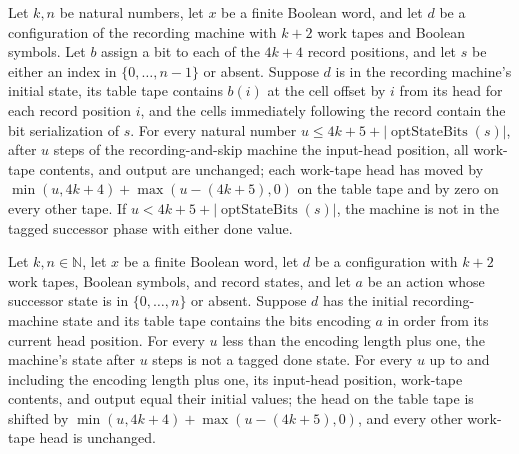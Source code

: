 \begin{lemma}
\label{Turing.StepBlock.recordSkipTM_path}
\leanok
{}
Let $k,n$ be natural numbers, let $x$ be a finite Boolean word, and let $d$ be a
configuration of the recording machine with $k+2$ work tapes and Boolean symbols. Let
$b$ assign a bit to each of the $4k+4$ record positions, and let $s$ be either an index
in $\{0,\ldots,n-1\}$ or absent. Suppose $d$ is in the recording machine's initial
state, its table tape contains $b(i)$ at the cell offset by $i$ from its head for each
record position $i$, and the cells immediately following the record contain the bit
serialization of $s$. For every natural number $u\le
4k+5+|\operatorname{optStateBits}(s)|$, after $u$ steps of the recording-and-skip
machine the input-head position, all work-tape contents, and output are unchanged; each
work-tape head has moved by $\min(u,4k+4)+\max(u-(4k+5),0)$ on the table tape and by
zero on every other tape. If $u<4k+5+|\operatorname{optStateBits}(s)|$, the machine is
not in the tagged successor phase with either done value.
\end{lemma}

\begin{lemma}
\label{Turing.StepBlock.recordSkipTM_spec}
\leanok
{}
Let $k,n\in\mathbb{N}$, let $x$ be a finite Boolean word, let $d$ be a configuration
with $k+2$ work tapes, Boolean symbols, and record states, and let $a$ be an action
whose successor state is in $\{0,\ldots,n\}$ or absent. Suppose $d$ has the initial
recording-machine state and its table tape contains the bits encoding $a$ in order from
its current head position. For every $u$ less than the encoding length plus one, the
machine's state after $u$ steps is not a tagged done state. For every $u$ up to and
including the encoding length plus one, its input-head position, work-tape contents, and
output equal their initial values; the head on the table tape is shifted by
$\min(u,4k+4)+\max(u-(4k+5),0)$, and every other work-tape head is unchanged.
\end{lemma}

